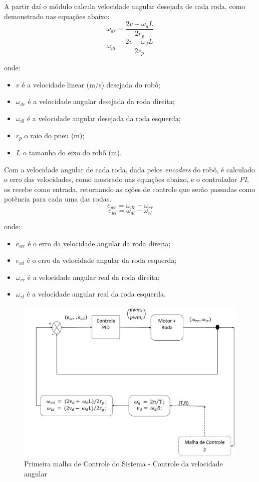 A partir daí o módulo calcula velocidade angular desejada de cada roda, como demonstrado nas equações abaixo:
\begin{equation}
\omega_{dr} = \dfrac{2v + \omega_{d}L}{2r_{p}}	
\label{eq:velocangulardireita}
\end{equation} 
\begin{equation}
\omega_{dl} = \dfrac{2v - \omega_{d}L}{2r_{p}}	
\label{eq:velocangularesquerda}
\end{equation} 

onde:
\begin{itemize}
	\item $v$ é a velocidade linear (m/s) desejada do robô;
	\item $\omega_{dr}$ é a velocidade angular desejada da roda direita;
	\item $\omega_{dl}$ é a velocidade angular desejada da roda esquerda;
	\item $r_{p}$ o raio do pneu (m);
	\item $L$ o tamanho do eixo do robô (m).	
\end{itemize}

Com a velocidade angular de cada roda, dada pelos \emph{encoders} do robô, é calculado o erro das velocidades, como mostrado nas equações abaixo, e o controlador \emph{PI}, os recebe como entrada, retornando as ações de controle que serão passadas como potência para cada uma das rodas.
\begin{equation}
e_{wr} = \omega_{dr} - \omega_{rr}
\label{eq:errVelAngDireita}
\end{equation} 
\begin{equation}
e_{wl} = \omega_{dl} - \omega_{rl}
\label{eq:errVelAngEsquerda}
\end{equation} 

onde:
\begin{itemize}
	\item $e_{wr}$ é o erro da velocidade angular da roda direita;
	\item $e_{wl}$ é o erro da velocidade angular da roda esquerda;
	\item $\omega_{rr}$ é a velocidade angular real da roda direita;
	\item $\omega_{rl}$ é a velocidade angular real da roda esquerda.	
\end{itemize}	

\begin{figure}[!htb]
	\centering
	\includegraphics[width=1.0\textwidth]{./04-figuras/malha1}
	\caption{Primeira malha de Controle do Sistema - Controle da velocidade angular}
	\label{fig:malha1}
\end{figure}

